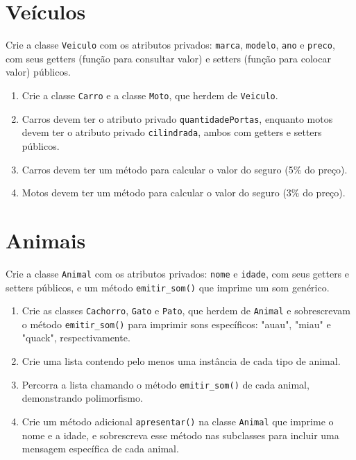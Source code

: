 \documentclass{article}
\begin{document}
\section{Veículos}
Crie a classe \texttt{Veiculo} com os atributos privados: \texttt{marca}, \texttt{modelo}, \texttt{ano} e
\texttt{preco}, com seus getters (função para consultar valor) e setters (função para colocar valor) públicos.

\begin{enumerate}
    \item Crie a classe \texttt{Carro} e a classe \texttt{Moto}, que herdem de \texttt{Veiculo}.
    \item Carros devem ter o atributo privado \texttt{quantidadePortas}, enquanto motos devem ter o atributo privado \texttt{cilindrada}, ambos com getters e setters públicos.
    \item Carros devem ter um método para calcular o valor do seguro (5\% do preço).
    \item Motos devem ter um método para calcular o valor do seguro (3\% do preço).

\end{enumerate}

\section{Animais}
Crie a classe \texttt{Animal} com os atributos privados: \texttt{nome} e \texttt{idade}, com seus getters e setters públicos, e um método \texttt{emitir\_som()} que imprime um som genérico.

\begin{enumerate}
    \item Crie as classes \texttt{Cachorro}, \texttt{Gato} e \texttt{Pato}, que herdem de \texttt{Animal} e sobrescrevam o método \texttt{emitir\_som()} para imprimir sons específicos: "auau", "miau" e "quack", respectivamente.
    \item Crie uma lista contendo pelo menos uma instância de cada tipo de animal.
    \item Percorra a lista chamando o método \texttt{emitir\_som()} de cada animal, demonstrando polimorfismo.
    \item Crie um método adicional \texttt{apresentar()} na classe \texttt{Animal} que imprime o nome e a idade, e sobrescreva esse método nas subclasses para incluir uma mensagem específica de cada animal.
\end{enumerate}
\end{document}
